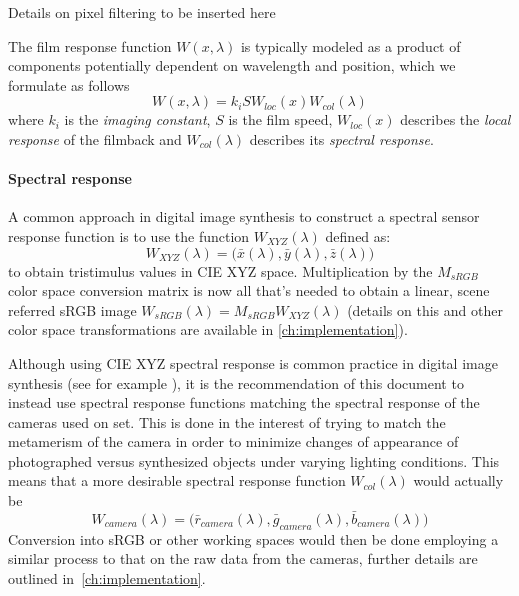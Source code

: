 \begin{inconstruction}
 Details on pixel filtering to be inserted here
\end{inconstruction}

The film response function $W(x, \lambda)$ is typically modeled as a product of
components potentially dependent on wavelength and position, which we formulate
as follows
\begin{equation}
W(x,\lambda) = k_i S W_{loc}(x) W_{col}(\lambda)
\end{equation}
where $k_i$ is the \textsl{imaging constant}, $S$ is the \gls{film speed},
$W_{loc}(x)$ describes the \textsl{local response} of the filmback and
$W_{col}(\lambda)$ describes its \textsl{spectral response}.

\paragraph{Spectral response}
A common approach in digital image synthesis to construct a spectral sensor
response function is to use the function $W_{XYZ}(\lambda)$ defined as:
\begin{equation}
W_{XYZ}(\lambda) = \big(\bar x(\lambda), \bar y (\lambda), \bar z(\lambda)\big)
\end{equation}
to obtain tristimulus values in \gls{CIE} \gls{XYZ} space.
Multiplication by the $M_{sRGB}$ color space conversion matrix is now all
that's needed to obtain a linear, scene referred \gls{sRGB} image
$W_{sRGB}(\lambda) = M_{sRGB} W_{XYZ}(\lambda)$
(details on this and other color space transformations are available in
\cref{ch:implementation}).

Although using \gls{CIE} \gls{XYZ} spectral response is common practice
in digital image synthesis (see for example \cite{pharr2010, jakob2010,
ward1994}), it is the recommendation of this document to instead use spectral
response functions matching the spectral response of the cameras used on set.
This is done in the interest of trying to match the metamerism of the camera in
order to minimize changes of appearance of photographed versus synthesized
objects under varying lighting conditions. This means that a more desirable
spectral response function $W_{col}(\lambda)$ would actually be
\begin{equation}
W_{camera}(\lambda) = \big(\bar r_{camera}(\lambda), \bar g_{camera}(\lambda),
\bar b_{camera}(\lambda)\big)
\end{equation}
Conversion into \gls{sRGB} or other working spaces would then be done employing
a similar process to that on the raw data from the cameras, further details are
outlined in~\cref{ch:implementation}.


